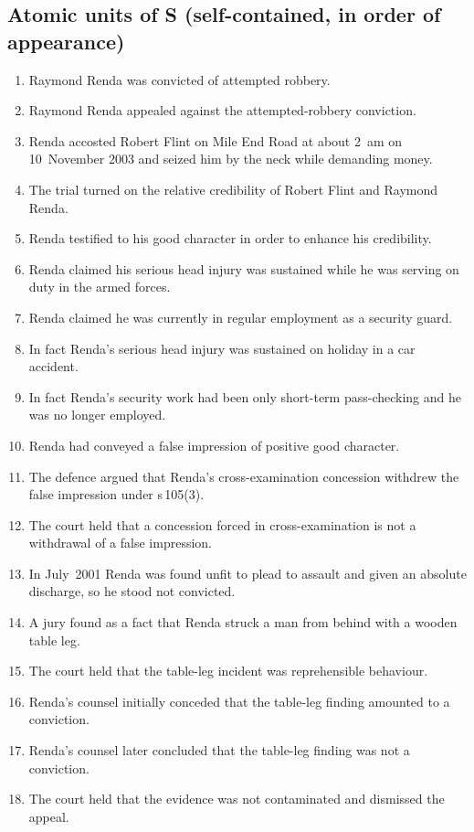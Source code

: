 \documentclass[11pt]{article}
\begin{document}
\subsection*{Atomic units of S (self-contained, in order of appearance)}
\begin{enumerate}[label=\textbf{L\arabic*.},leftmargin=*]
  \item Raymond Renda was convicted of attempted robbery.
  \item Raymond Renda appealed against the attempted-robbery conviction.
  \item Renda accosted Robert Flint on Mile End Road at about 2~am on 10~November 2003 and seized him by the neck while demanding money.
  \item The trial turned on the relative credibility of Robert Flint and Raymond Renda.
  \item Renda testified to his good character in order to enhance his credibility.
  \item Renda claimed his serious head injury was sustained while he was serving on duty in the armed forces.
  \item Renda claimed he was currently in regular employment as a security guard.
  \item In fact Renda's serious head injury was sustained on holiday in a car accident.
  \item In fact Renda's security work had been only short-term pass-checking and he was no longer employed.
  \item Renda had conveyed a false impression of positive good character.
  \item The defence argued that Renda's cross-examination concession withdrew the false impression under s\,105(3).
  \item The court held that a concession forced in cross-examination is not a withdrawal of a false impression.
  \item In July~2001 Renda was found unfit to plead to assault and given an absolute discharge, so he stood not convicted.
  \item A jury found as a fact that Renda struck a man from behind with a wooden table leg.
  \item The court held that the table-leg incident was reprehensible behaviour.
  \item Renda's counsel initially conceded that the table-leg finding amounted to a conviction.
  \item Renda's counsel later concluded that the table-leg finding was not a conviction.
  \item The court held that the evidence was not contaminated and dismissed the appeal.
\end{enumerate}
\end{document}
